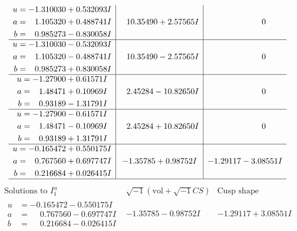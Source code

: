 \documentclass[1p]{elsarticle_modified}
\theoremstyle{definition}
\newcommand{\I}{\sqrt{-1}}
\begin{document}
$$\begin{array}{c|c|c}
\begin{aligned}
u &= -1.310030 + 0.532093 I \\
a &= \phantom{-}1.105320 + 0.488741 I \\
b &= \phantom{-}0.985273 - 0.830058 I\end{aligned}
 & \phantom{-}10.35490 + 2.57565 I & \phantom{-0.000000 } 0 \\ \hline\begin{aligned}
u &= -1.310030 - 0.532093 I \\
a &= \phantom{-}1.105320 - 0.488741 I \\
b &= \phantom{-}0.985273 + 0.830058 I\end{aligned}
 & \phantom{-}10.35490 - 2.57565 I & \phantom{-0.000000 } 0 \\ \hline\begin{aligned}
u &= -1.27900 + 0.61571 I \\
a &= \phantom{-}1.48471 + 0.10969 I \\
b &= \phantom{-}0.93189 - 1.31791 I\end{aligned}
 & \phantom{-}2.45284 - 10.82650 I & \phantom{-0.000000 } 0 \\ \hline\begin{aligned}
u &= -1.27900 - 0.61571 I \\
a &= \phantom{-}1.48471 - 0.10969 I \\
b &= \phantom{-}0.93189 + 1.31791 I\end{aligned}
 & \phantom{-}2.45284 + 10.82650 I & \phantom{-0.000000 } 0 \\ \hline\begin{aligned}
u &= -0.165472 + 0.550175 I \\
a &= \phantom{-}0.767560 + 0.697747 I \\
b &= \phantom{-}0.216684 + 0.026415 I\end{aligned}
 & -1.35785 + 0.98752 I & -1.29117 - 3.08551 I\\
 \hline 
 \end{array}$$\newpage$$\begin{array}{c|c|c}  
\text{Solutions to }I^u_{1}& \I (\text{vol} + \sqrt{-1}CS) & \text{Cusp shape}\\
 \hline 
\begin{aligned}
u &= -0.165472 - 0.550175 I \\
a &= \phantom{-}0.767560 - 0.697747 I \\
b &= \phantom{-}0.216684 - 0.026415 I\end{aligned}
 & -1.35785 - 0.98752 I & -1.29117 + 3.08551 I \\ \hline\begin{aligned}

\end{aligned}
\end{array}$$
\end{document}
